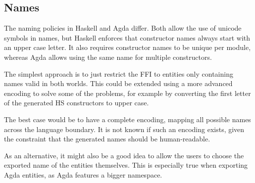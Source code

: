 \documentclass[12pt, a4paper, twoside]{report}
\begin{document}
\subsection{Names}
The naming policies in Haskell and Agda differ. Both allow the use of unicode symbols in names, but Haskell enforces
that constructor names always start with an upper case letter. It also requires constructor names to be unique
per module, whereas Agda allows using the same name for multiple constructors.

The simplest approach is to just restrict the FFI to entities only containing names valid in both worlds.
This could be extended using a more advanced encoding to solve some of the problems, for example
by converting the first letter of the generated HS constructors to upper case.

The best case would be to have a complete encoding, mapping all possible names across the language boundary. It is not known
if such an encoding exists, given the constraint that the generated names should be human-readable.

As an alternative, it might also be a good idea to allow the users to choose the exported name of the entities themselves.
This is especially true when exporting Agda entities, as Agda features a bigger namespace.
\end{document}
